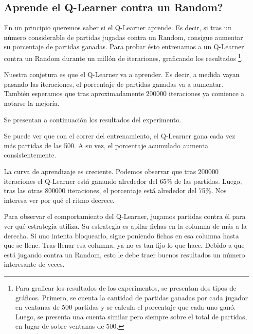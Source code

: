 \subsection{Aprende el Q-Learner contra un Random?}

En un principio queremos saber si el Q-Learner aprende. Es decir, si tras un número considerable de partidas jugadas contra un Random, consigue aumentar su porcentaje de partidas ganadas. Para probar ésto entrenamos a un Q-Learner contra un Random durante un millón de iteraciones, graficando los resultados \footnote{Para graficar los resultados de los experimentos, se presentan dos tipos de gráficos. Primero, se cuenta la cantidad de partidas ganadas por cada jugador en ventanas de 500 partidas y se calcula el porcentaje que cada uno ganó. Luego, se presenta una cuenta similar pero siempre sobre el total de partidas, en lugar de sobre ventanas de 500.}.

Nuestra conjetura es que el Q-Learner va a aprender. Es decir, a medida vayan pasando las iteraciones, el porcentaje de partidas ganadas va a aumentar. También esperamos que tras aproximadamente 200000 iteraciones ya comience a notarse la mejoría.

Se presentan a continuación los resultados del experimento.



Se puede ver que con el correr del entrenamiento, el Q-Learner gana cada vez m\'as partidas de las 500. A su vez, el porcentaje acumulado aumenta consistentemente.

La curva de aprendizaje es creciente. Podemos observar que tras 200000 iteraciones el Q-Learner está ganando alrededor del 65\% de las partidas. Luego, tras las otras 800000 iteraciones, el porcentaje está alrededor del 75\%. Nos interesa ver por qué el ritmo decrece.

Para observar el comportamiento del Q-Learner, jugamos partidas contra él para ver qué estrategia utiliza. Su estrategia es apilar fichas en la columna de más a la derecha. Si uno intenta bloquearlo, sigue poniendo fichas en esa columna hasta que se llene. Tras llenar esa columna, ya no es tan fijo lo que hace. Debido a que está jugando contra un Random, esto le debe traer buenos resultados un número interesante de veces.

